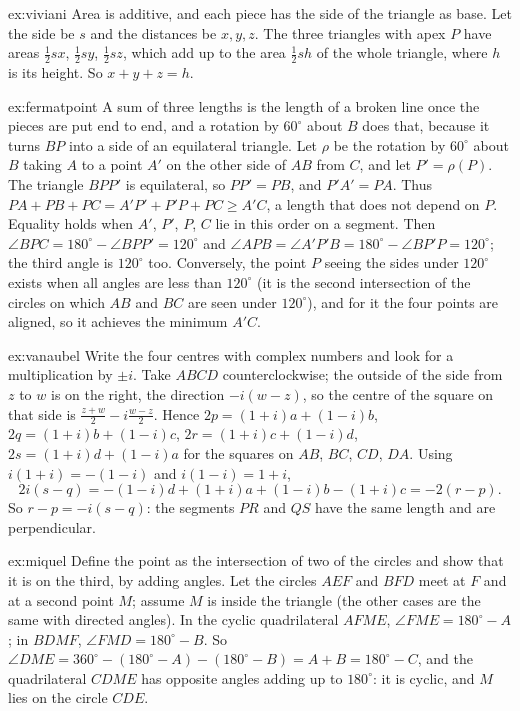 \begin{solution}{ex:viviani}
\idea Area is additive, and each piece has the side of the triangle as base.
\writeup Let the side be $s$ and the distances be $x,y,z$. The three triangles with apex $P$ have areas $\frac12sx$, $\frac12sy$, $\frac12sz$,
which add up to the area $\frac12sh$ of the whole triangle, where $h$ is its height. So $x+y+z=h$.
\end{solution}

\begin{solution}{ex:fermatpoint}
\idea A sum of three lengths is the length of a broken line once the pieces are put end to end, and a rotation by $60^\circ$ about $B$ does
that, because it turns $BP$ into a side of an equilateral triangle.
\writeup Let $\rho$ be the rotation by $60^\circ$ about $B$ taking $A$ to a point $A'$ on the other side of $AB$ from $C$, and let
$P'=\rho(P)$. The triangle $BPP'$ is equilateral, so $PP'=PB$, and $P'A'=PA$. Thus $PA+PB+PC=A'P'+P'P+PC\ge A'C$, a length that does not
depend on $P$. Equality holds when $A'$, $P'$, $P$, $C$ lie in this order on a segment. Then $\angle BPC=180^\circ-\angle BPP'=120^\circ$
and $\angle APB=\angle A'P'B=180^\circ-\angle BP'P=120^\circ$; the third angle is $120^\circ$ too. Conversely, the point $P$ seeing the sides
under $120^\circ$ exists when all angles are less than $120^\circ$ (it is the second intersection of the circles on which $AB$ and $BC$ are
seen under $120^\circ$), and for it the four points are aligned, so it achieves the minimum $A'C$.
\end{solution}

\begin{solution}{ex:vanaubel}
\idea Write the four centres with complex numbers and look for a multiplication by $\pm i$.
\writeup Take $ABCD$ counterclockwise; the outside of the side from $z$ to $w$ is on the right, the direction $-i(w-z)$, so the centre of the
square on that side is $\frac{z+w}2-i\frac{w-z}2$. Hence $2p=(1+i)a+(1-i)b$, $2q=(1+i)b+(1-i)c$, $2r=(1+i)c+(1-i)d$, $2s=(1+i)d+(1-i)a$
for the squares on $AB$, $BC$, $CD$, $DA$. Using $i(1+i)=-(1-i)$ and $i(1-i)=1+i$,
\[
2i(s-q)=-(1-i)d+(1+i)a+(1-i)b-(1+i)c=-2(r-p).
\]
So $r-p=-i(s-q)$: the segments $PR$ and $QS$ have the same length and are perpendicular.
\end{solution}

\begin{solution}{ex:miquel}
\idea Define the point as the intersection of two of the circles and show that it is on the third, by adding angles.
\writeup Let the circles $AEF$ and $BFD$ meet at $F$ and at a second point $M$; assume $M$ is inside the triangle (the other cases are
the same with directed angles). In the cyclic quadrilateral $AFME$, $\angle FME=180^\circ-A$; in $BDMF$, $\angle FMD=180^\circ-B$. So
$\angle DME=360^\circ-(180^\circ-A)-(180^\circ-B)=A+B=180^\circ-C$, and the quadrilateral $CDME$ has opposite angles adding up to $180^\circ$:
it is cyclic, and $M$ lies on the circle $CDE$.
\end{solution}

